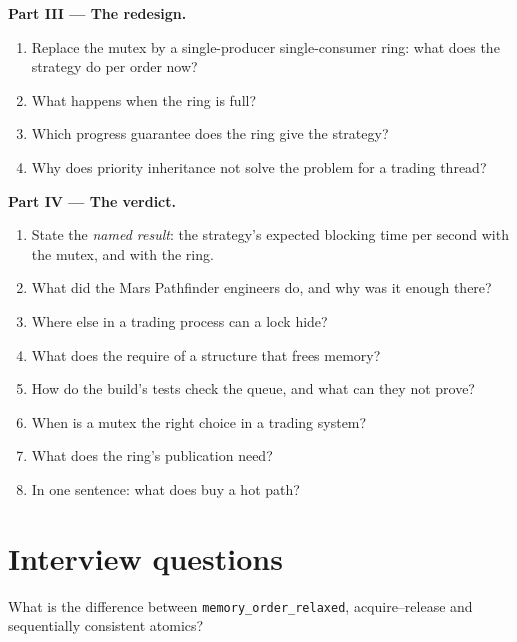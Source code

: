 \begin{problem}
\medskip\noindent\textbf{Part III --- The redesign.}
\begin{enumerate}[resume]
\item Replace the mutex by a single-producer single-consumer ring: what does the strategy do per order now?
\item What happens when the ring is full?
\item Which progress guarantee does the ring give the strategy?
\item Why does priority inheritance not solve the problem for a trading thread?
\end{enumerate}

\medskip\noindent\textbf{Part IV --- The verdict.}
\begin{enumerate}[resume]
\item State the \emph{named result}: the strategy's expected blocking time per second with the mutex, and with the ring.
\item What did the Mars Pathfinder engineers do, and why was it enough there?
\item Where else in a trading process can a lock hide?
\item What does the  require of a  structure that frees memory?
\item How do the build's tests check the queue, and what can they not prove?
\item When is a mutex the right choice in a trading system?
\item What  does the ring's publication need?
\item In one sentence: what does  buy a hot path?
\end{enumerate}
\end{problem}

\section{Interview questions}

\begin{interviewq}\label{iq:ll:lock-free-programming:1}
What is the difference between \texttt{memory\_order\_relaxed}, acquire--release and sequentially consistent atomics?
\end{interviewq}

